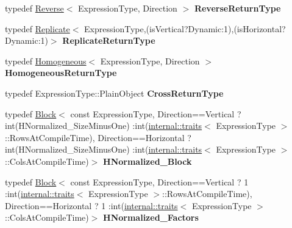 \begin{DoxyCompactItemize}
typedef \mbox{\hyperlink{class_eigen_1_1_reverse}{Reverse}}$<$ Expression\+Type, Direction $>$ {\bfseries Reverse\+Return\+Type}
\item 
\mbox{\label{class_eigen_1_1_vectorwise_op_abfe9aeb1ded98c24c09837a8da037a60}} 
typedef \mbox{\hyperlink{class_eigen_1_1_replicate}{Replicate}}$<$ Expression\+Type,(is\+Vertical?Dynamic\+:1),(is\+Horizontal?Dynamic\+:1)$>$ {\bfseries Replicate\+Return\+Type}
\item 
\mbox{\label{class_eigen_1_1_vectorwise_op_a988c7bd3e6ae202e287a59c0a6d3d67c}} 
typedef \mbox{\hyperlink{class_eigen_1_1_homogeneous}{Homogeneous}}$<$ Expression\+Type, Direction $>$ {\bfseries Homogeneous\+Return\+Type}
\item 
\mbox{\label{class_eigen_1_1_vectorwise_op_a1dbae778809df72722f2ecaa2e4174e0}} 
typedef Expression\+Type\+::\+Plain\+Object {\bfseries Cross\+Return\+Type}
\item 
\mbox{\label{class_eigen_1_1_vectorwise_op_a4bf5c62a154671b541238e73feb182b4}} 
typedef \mbox{\hyperlink{class_eigen_1_1_block}{Block}}$<$ const Expression\+Type, Direction==Vertical ? int(H\+Normalized\+\_\+\+Size\+Minus\+One) \+:int(\mbox{\hyperlink{struct_eigen_1_1internal_1_1traits}{internal\+::traits}}$<$ Expression\+Type $>$\+::Rows\+At\+Compile\+Time), Direction==Horizontal ? int(H\+Normalized\+\_\+\+Size\+Minus\+One) \+:int(\mbox{\hyperlink{struct_eigen_1_1internal_1_1traits}{internal\+::traits}}$<$ Expression\+Type $>$\+::Cols\+At\+Compile\+Time)$>$ {\bfseries H\+Normalized\+\_\+\+Block}
\item 
\mbox{\label{class_eigen_1_1_vectorwise_op_acaa761de8914859a48224986dc78e077}} 
typedef \mbox{\hyperlink{class_eigen_1_1_block}{Block}}$<$ const Expression\+Type, Direction==Vertical ? 1 \+:int(\mbox{\hyperlink{struct_eigen_1_1internal_1_1traits}{internal\+::traits}}$<$ Expression\+Type $>$\+::Rows\+At\+Compile\+Time), Direction==Horizontal ? 1 \+:int(\mbox{\hyperlink{struct_eigen_1_1internal_1_1traits}{internal\+::traits}}$<$ Expression\+Type $>$\+::Cols\+At\+Compile\+Time)$>$ {\bfseries H\+Normalized\+\_\+\+Factors}
\item 
\mbox{\label{class_eigen_1_1_vectorwise_op_a0c6fef40103ff8b5f727cc9c8eeb3b5f}} 

\end{DoxyCompactItemize}
